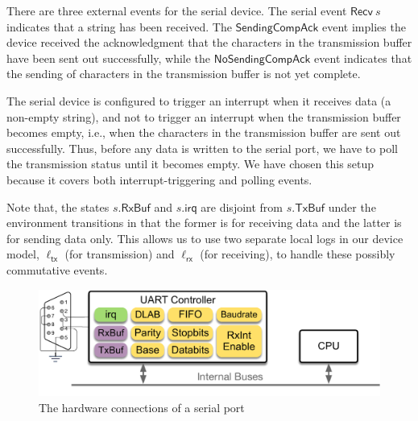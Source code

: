 There are three external events for the serial device. The serial event
$\textsf{Recv}~ s$ indicates that a string has been received. The
$\textsf{SendingCompAck}$ event implies the device received the acknowledgment
that the characters in the transmission buffer have been sent out successfully,
while the $\textsf{NoSendingCompAck}$ event indicates that the sending of
characters in the transmission buffer is not yet complete.

The serial device is configured to trigger an interrupt when it receives data (a
non-empty string), and not to trigger an interrupt when the transmission buffer
becomes empty, i.e., when the characters in the transmission buffer are sent out
successfully. Thus, before any data is written to the serial port, we have to
poll the transmission status until it becomes empty. We have chosen this setup
because it covers both interrupt-triggering and polling events.

Note that, the states $s.\mathsf{RxBuf}$ and $s.\mathsf{irq}$ are disjoint from
$s.\mathsf{TxBuf}$ under the environment transitions in that the former is for
receiving data and the latter is for sending data only.  This allows us to use
two separate local logs in our device model, $\ell_{\textsf{tx}}$ (for
transmission) and $\ell_{\textsf{rx}}$ (for receiving), to handle these possibly
commutative events.

\begin{figure}
	\begin{center}
		\includegraphics[scale=0.4]{figs/serial}
	\end{center}
	\caption{The hardware connections of a serial port}
	\label{fig:serial}
\end{figure}

